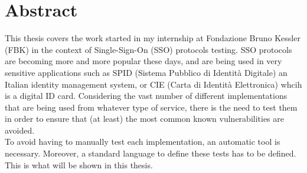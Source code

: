 \chapter*{Abstract} %

This thesis covers the work started in my internship at Fondazione Bruno Kessler (FBK) in the context of Single-Sign-On (\gls{SSO}) protocols testing. SSO protocols are becoming more and more popular these days, and are being used in very sensitive applications such as SPID (Sistema Pubblico di Identità Digitale) an Italian identity management system, or CIE (Carta di Identità Elettronica) whcih is a digital ID card. Considering the vast number of different implementations that are being used from whatever type of service, there is the need to test them in order to ensure that (at least) the most common known vulnerabilities are avoided.\\
To avoid having to manually test each implementation, an automatic tool is necessary. Moreover, a standard language to define these tests has to be defined.
This is what will be shown in this thesis. 


